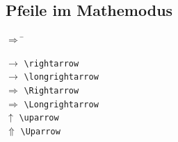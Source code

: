 \begin{minipage}{\textwidth}
\subsection{Pfeile im Mathemodus}
\begin{multicols}{3}
\begin{tabbing}
$\Longrightarrow$ \hspace{0.01cm} \= \kill %

$\rightarrow$			\>	\lstinline|\rightarrow| 	\\
$\longrightarrow$	\>	\lstinline|\longrightarrow|	\\
$\Rightarrow$			\>	\lstinline|\Rightarrow| 	\\
$\Longrightarrow$	\>	\lstinline|\Longrightarrow| 	\\
$\uparrow$				\>	\lstinline|\uparrow| 	\\
$\Uparrow$				\>	\lstinline|\Uparrow| 	\\


\end{tabbing}
\end{multicols}
\end{minipage}
